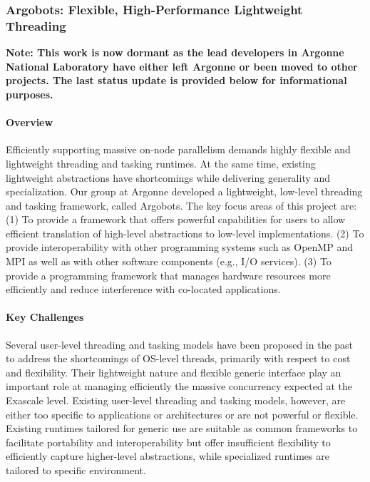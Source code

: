 \subsubsection{ Argobots: Flexible, High-Performance Lightweight Threading }

\textbf{Note: This work is now dormant as the lead developers in Argonne National Laboratory have either left Argonne or been moved to other projects. The last status update is provided below for informational purposes.}

\paragraph{Overview}
Efficiently supporting massive on-node parallelism demands highly
flexible and lightweight threading and tasking runtimes. At the
same time, existing lightweight abstractions have shortcomings while
delivering generality and specialization.  Our group at Argonne
developed a lightweight, low-level threading and tasking framework,
called Argobots.  The key focus areas of this project are: (1) To
provide a framework that offers powerful capabilities for users to
allow efficient translation of high-level abstractions to low-level
implementations. (2) To provide interoperability with other
programming systems such as OpenMP and MPI as well as with other
software components (e.g., I/O services). (3) To provide a programming
framework that manages hardware resources more efficiently and reduce
interference with co-located applications.

\paragraph{Key Challenges}
Several user-level threading and tasking models have been proposed in
the past to address the shortcomings of OS-level threads, primarily
with respect to cost and flexibility. Their lightweight nature and
flexible generic interface play an important role at managing
efficiently the massive concurrency expected at the Exascale level.
Existing user-level threading and tasking models, however, are either
too specific to applications or architectures or are not powerful or
flexible. Existing runtimes tailored for generic use \cite{GNUPth,
PLDI97_Taura, COSET05_Thibault, COB14_Nakashima, MTAAP08_Wheeler,
PPoPP99_Taura, SenSys06_Dunkels, TBB1, EuroPar08_Perache} are suitable
as common frameworks to facilitate portability and interoperability
but offer insufficient flexibility to efficiently capture higher-level
abstractions, while specialized runtimes \cite{ATC02_Adya,
SolarisThreads, SOSP03_von_Behren, StateThreads, PLDI07_Li,
MTAAP09_Porterfield, WMPP05_Cuvillo, IntelOMP, Nanos++, LCPC96_Kale,
PACT14_Treichler} are tailored to specific environment.

